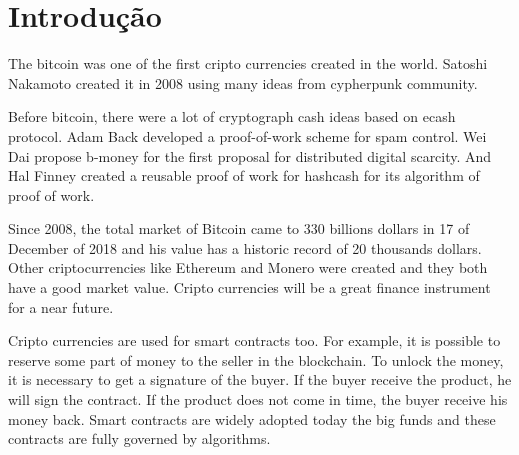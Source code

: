 \documentclass[12pt]{article}
\begin{document}
\tableofcontents
\pagebreak

\renewcommand{\thesection}{\arabic{section}}
\section{Introdução}

The bitcoin \cite{nakamoto2008bitcoin} was one of the first cripto currencies created in the world.
Satoshi Nakamoto created it in 2008 using many ideas from cypherpunk community.


Before bitcoin, there were a lot of cryptograph cash ideas based on ecash protocol.
Adam Back developed a proof-of-work scheme for spam control.
Wei Dai propose b-money for the first proposal for distributed digital scarcity.
And Hal Finney created a reusable proof of work for hashcash for its algorithm of proof of work.

Since 2008, the total market of Bitcoin came to 330 billions dollars in 17 of December of 2018
and his value has a historic record of 20 thousands dollars.
Other criptocurrencies like Ethereum and Monero were created and they both have a good market value.
Cripto currencies will be a great finance instrument for a near future.


Cripto currencies are used for smart contracts too.
For example, it is possible to reserve some part of money to the seller in the blockchain.
To unlock the money, it is necessary to get a signature of the buyer.
If the buyer receive the product, he will sign the contract.
If the product does not come in time, the buyer receive his money back.
Smart contracts are widely adopted today the big funds and
these contracts are fully governed by algorithms.

\end{document}
